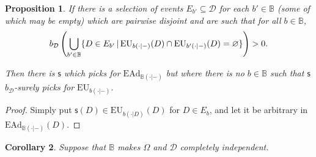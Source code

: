 \documentclass[a4paper]{article}
\newtheorem{theorem}{Theorem}
\newtheorem{proposition}[theorem]{Proposition}
\newtheorem{corollary}[theorem]{Corollary}
\renewcommand\P{\mathbb{P}} %
\newcommand\EU{\mathrm{EU}}
\newcommand\EAd{\mathrm{EAd}}
\newcommand{\Decs}{\mathcal{D}}
\newcommand\s{\mathsf{s}}
\newcommand{\IB}{\mathbb{B}}
\newcommand{\IP}{\P}
\renewcommand{\color}[1]{}
\newenvironment{colored}[1]{\leavevmode\color{#1}}{}
\newcommand\SetDelimiter[1][]{
	\nonscript\,#1\vert \allowbreak \nonscript\,\mathopen{}}
\providecommand\given{\SetDelimiter}
\renewcommand{\emptyset}{\varnothing}
\newenvironment{CCM rewritten}
{\begingroup\color{blue}} %
{\endgroup}              %
\begin{document}
\begin{colored}{violet}
\begin{proposition}
	If there is a selection of events $E_{b'}\subseteq\Decs$ for each $b'\in\IB$ (some of which may be empty) which are pairwise disjoint and are such that for all $b\in\IB$, $$b_\Decs\left(\bigcup_{b'\in\IB}\{D\in E_{b'}\given \EU_{b(\cdot|-)}(D)\cap \EU_{b'(\cdot|-)}(D)=\emptyset\}\right)>0.$$
	
	Then there is $\s$ which picks for $\EAd_{\IB(\cdot|-)}$ but where there is no $b\in\IB$ such that $\s$  $b_\Decs$-surely picks for $\EU_{b(\cdot|-)}$. 
\end{proposition}
\begin{proof}
	Simply put $\s(D)\in\EU_{b(\cdot|D)}(D)$ for $D\in E_b$, and let it be arbitrary in $\EAd_{\IB(\cdot|-)}(D)$. 
\end{proof}

%

%		
%	
%




\begin{corollary}
	Suppose that $\IB$ makes $\Omega$ and $\Decs$ completely independent. 
	

\end{corollary}
\end{colored}
\end{document}
